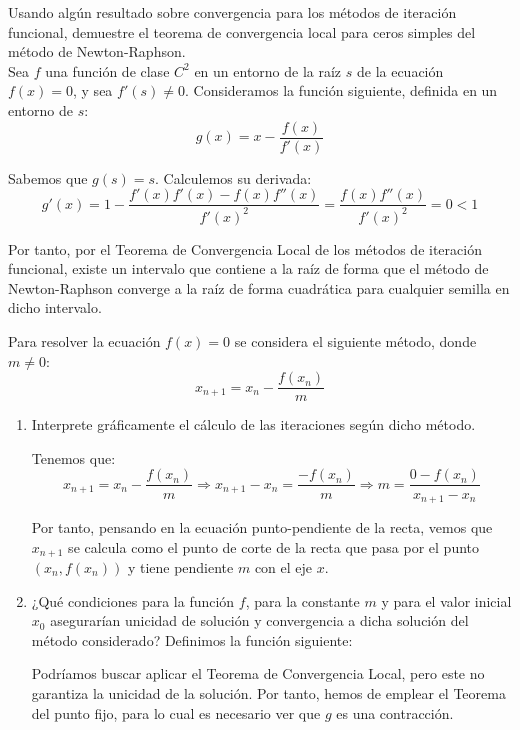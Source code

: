 \begin{ejercicio}\label{ej:1.1.6}
    Usando algún resultado sobre convergencia para los métodos de iteración funcional, demuestre el teorema de convergencia local para ceros simples del método de Newton-Raphson.\\

    Sea $f$ una función de clase $C^2$ en un entorno de la raíz $s$ de la ecuación $f(x)=0$, y sea $f'(s)\neq 0$. Consideramos la función siguiente, definida en un entorno de $s$:
    \begin{equation*}
        g(x)=x-\frac{f(x)}{f'(x)}
    \end{equation*}

    Sabemos que $g(s)=s$. Calculemos su derivada:
    \begin{equation*}
        g'(x)=1-\frac{f'(x)f'(x)-f(x)f''(x)}{f'(x)^2}=\frac{f(x)f''(x)}{f'(x)^2}=0<1
    \end{equation*}

    Por tanto, por el Teorema de Convergencia Local de los métodos de iteración funcional, existe un intervalo que contiene a la raíz de forma que el método de Newton-Raphson converge a la raíz de forma cuadrática para cualquier semilla en dicho intervalo.
\end{ejercicio}

\begin{ejercicio}\label{ej:1.1.7}
    Para resolver la ecuación $f(x) = 0$ se considera el siguiente método, donde $m \neq 0$:
    $$x_{n+1} = x_n - \frac{f(x_n)}{m}$$
    \begin{enumerate}
        \item Interprete gráficamente el cálculo de las iteraciones según dicho método.
        
        Tenemos que:
        \begin{equation*}
            x_{n+1} = x_n - \frac{f(x_n)}{m}
            \Longrightarrow
            x_{n+1}-x_n  = \frac{-f(x_n)}{m}
            \Longrightarrow
            m = \frac{0-f(x_n)}{x_{n+1}-x_n}
        \end{equation*}

        Por tanto, pensando en la ecuación punto-pendiente de la recta, vemos que $x_{n+1}$ se calcula como el punto de corte de la recta que pasa por el punto $(x_n, f(x_n))$ y tiene pendiente $m$ con el eje $x$.
        \item ¿Qué condiciones para la función $f$, para la constante $m$ y para el valor inicial $x_0$ asegurarían unicidad de solución y convergencia a dicha solución del método considerado?
        Definimos la función siguiente:

        Podríamos buscar aplicar el Teorema de Convergencia Local, pero este no garantiza la unicidad de la solución. Por tanto, hemos de emplear el Teorema del punto fijo, para lo cual es necesario ver que $g$ es una contracción.
    \end{enumerate}
\end{ejercicio}

